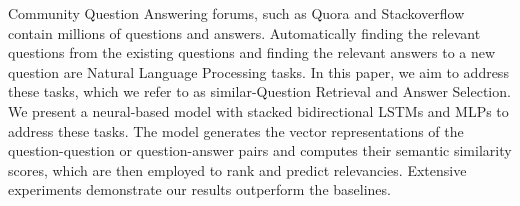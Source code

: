 Community Question Answering forums, such as Quora and Stackoverflow contain millions of questions and answers. Automatically finding the relevant questions from the existing questions and finding the relevant answers to a new question are Natural Language Processing tasks. In this paper, we aim to address these tasks, which we refer to as similar-Question Retrieval and Answer Selection. We present a neural-based model with stacked bidirectional LSTMs and MLPs to address these tasks. The model generates the vector representations of the question-question or question-answer pairs and computes their semantic similarity scores, which are then employed to rank and predict relevancies. Extensive experiments demonstrate our results outperform the baselines.
